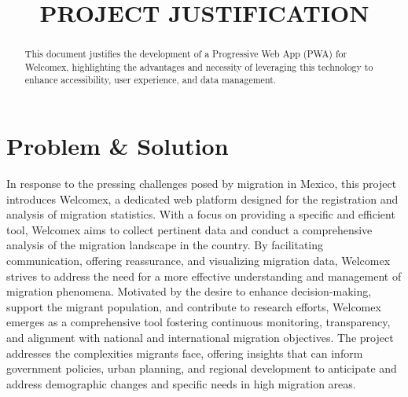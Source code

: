 \documentclass[conference]{IEEEtran}
\begin{document}
\title{PROJECT JUSTIFICATION}

\author{
\and
{}
\and
{}
\and
{}
\and
{}
}

\maketitle

\begin{abstract}
This document justifies the development of a Progressive Web App (PWA) for Welcomex, highlighting the advantages and necessity of leveraging this technology to enhance accessibility, user experience, and data management.
\end{abstract}

\section{Problem \& Solution}
In response to the pressing challenges posed by migration in Mexico, this project introduces Welcomex, a dedicated web platform designed for the registration and analysis of migration statistics. With a focus on providing a specific and efficient tool, Welcomex aims to collect pertinent data and conduct a comprehensive analysis of the migration landscape in the country. By facilitating communication, offering reassurance, and visualizing migration data, Welcomex strives to address the need for a more effective understanding and management of migration phenomena. Motivated by the desire to enhance decision-making, support the migrant population, and contribute to research efforts, Welcomex emerges as a comprehensive tool fostering continuous monitoring, transparency, and alignment with national and international migration objectives. The project addresses the complexities migrants face, offering insights that can inform government policies, urban planning, and regional development to anticipate and address demographic changes and specific needs in high migration areas.
\end{document}
